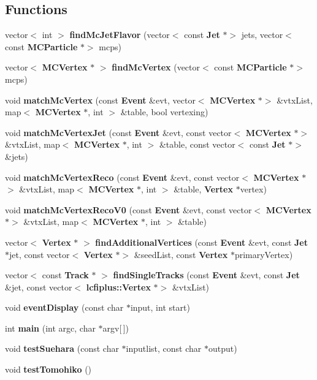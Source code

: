 \subsection*{Functions}
\begin{DoxyCompactItemize}
\item 
vector$<$ int $>$ \textbf{ find\+Mc\+Jet\+Flavor} (vector$<$ const \textbf{ Jet} $\ast$$>$ jets, vector$<$ const \textbf{ M\+C\+Particle} $\ast$$>$ mcps)
\item 
vector$<$ \textbf{ M\+C\+Vertex} $\ast$ $>$ \textbf{ find\+Mc\+Vertex} (vector$<$ const \textbf{ M\+C\+Particle} $\ast$$>$ mcps)
\item 
void \textbf{ match\+Mc\+Vertex} (const \textbf{ Event} \&evt, vector$<$ \textbf{ M\+C\+Vertex} $\ast$$>$ \&vtx\+List, map$<$ \textbf{ M\+C\+Vertex} $\ast$, int $>$ \&table, bool vertexing)
\item 
void \textbf{ match\+Mc\+Vertex\+Jet} (const \textbf{ Event} \&evt, const vector$<$ \textbf{ M\+C\+Vertex} $\ast$$>$ \&vtx\+List, map$<$ \textbf{ M\+C\+Vertex} $\ast$, int $>$ \&table, const vector$<$ const \textbf{ Jet} $\ast$$>$ \&jets)
\item 
void \textbf{ match\+Mc\+Vertex\+Reco} (const \textbf{ Event} \&evt, const vector$<$ \textbf{ M\+C\+Vertex} $\ast$$>$ \&vtx\+List, map$<$ \textbf{ M\+C\+Vertex} $\ast$, int $>$ \&table, \textbf{ Vertex} $\ast$vertex)
\item 
void \textbf{ match\+Mc\+Vertex\+Reco\+V0} (const \textbf{ Event} \&evt, const vector$<$ \textbf{ M\+C\+Vertex} $\ast$$>$ \&vtx\+List, map$<$ \textbf{ M\+C\+Vertex} $\ast$, int $>$ \&table)
\item 
vector$<$ \textbf{ Vertex} $\ast$ $>$ \textbf{ find\+Additional\+Vertices} (const \textbf{ Event} \&evt, const \textbf{ Jet} $\ast$jet, const vector$<$ \textbf{ Vertex} $\ast$$>$ \&seed\+List, const \textbf{ Vertex} $\ast$primary\+Vertex)
\item 
vector$<$ const \textbf{ Track} $\ast$ $>$ \textbf{ find\+Single\+Tracks} (const \textbf{ Event} \&evt, const \textbf{ Jet} \&jet, const vector$<$ \textbf{ lcfiplus\+::\+Vertex} $\ast$$>$ \&vtx\+List)
\item 
void \textbf{ event\+Display} (const char $\ast$input, int start)
\item 
int \textbf{ main} (int argc, char $\ast$argv[$\,$])
\item 
void \textbf{ test\+Suehara} (const char $\ast$inputlist, const char $\ast$output)
\item 
void \textbf{ test\+Tomohiko} ()
\end{DoxyCompactItemize}
